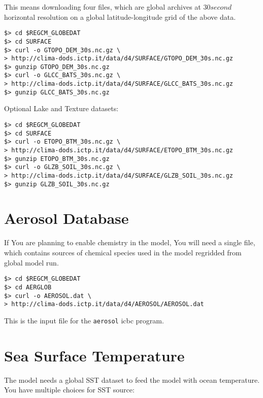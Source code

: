 This means downloading four files, which are global archives at $30 second$
horizontal resolution on a global latitude-longitude grid of the above data.

\begin{Verbatim}
$> cd $REGCM_GLOBEDAT
$> cd SURFACE
$> curl -o GTOPO_DEM_30s.nc.gz \
> http://clima-dods.ictp.it/data/d4/SURFACE/GTOPO_DEM_30s.nc.gz
$> gunzip GTOPO_DEM_30s.nc.gz
$> curl -o GLCC_BATS_30s.nc.gz \
> http://clima-dods.ictp.it/data/d4/SURFACE/GLCC_BATS_30s.nc.gz
$> gunzip GLCC_BATS_30s.nc.gz
\end{Verbatim}

Optional Lake and Texture datasets:

\begin{Verbatim}
$> cd $REGCM_GLOBEDAT
$> cd SURFACE
$> curl -o ETOPO_BTM_30s.nc.gz \
> http://clima-dods.ictp.it/data/d4/SURFACE/ETOPO_BTM_30s.nc.gz
$> gunzip ETOPO_BTM_30s.nc.gz
$> curl -o GLZB_SOIL_30s.nc.gz \
> http://clima-dods.ictp.it/data/d4/SURFACE/GLZB_SOIL_30s.nc.gz
$> gunzip GLZB_SOIL_30s.nc.gz
\end{Verbatim}

\section{Aerosol Database}

If You are planning to enable chemistry in the model, You will need a single
file, which contains sources of chemical species used in the model regridded
from global model run.

\begin{Verbatim}
$> cd $REGCM_GLOBEDAT
$> cd AERGLOB
$> curl -o AEROSOL.dat \
> http://clima-dods.ictp.it/data/d4/AEROSOL/AEROSOL.dat
\end{Verbatim}

This is the input file for the \verb=aerosol= icbc program.

\section{Sea Surface Temperature}

The model needs a global SST dataset to feed the model with ocean temperature.
You have multiple choices for SST source:

